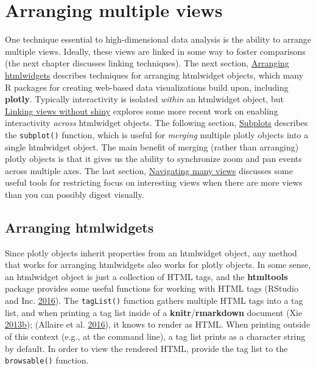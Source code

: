 \documentclass[12pt,]{isuthesis}
\begin{document}
\hypertarget{arranging-multiple-views}{\section{Arranging multiple
views}\label{arranging-multiple-views}}

One technique essential to high-dimensional data analysis is the ability
to arrange multiple views. Ideally, these views are linked in some way
to foster comparisons (the next chapter discusses linking techniques).
The next section, \protect\hyperlink{arranging-htmlwidgets}{Arranging
htmlwidgets} describes techniques for arranging htmlwidget objects,
which many R packages for creating web-based data visualizations build
upon, including \textbf{plotly}. Typically interactivity is isolated
\emph{within} an htmlwidget object, but
\protect\hyperlink{linking-views-without-shiny}{Linking views without
shiny} explores some more recent work on enabling interactivity
\emph{across} htmlwidget objects. The following section,
\protect\hyperlink{subplots}{Subplots} describes the \texttt{subplot()}
function, which is useful for \emph{merging} multiple plotly objects
into a single htmlwidget object. The main benefit of merging (rather
than arranging) plotly objects is that it gives us the ability to
synchronize zoom and pan events across multiple axes. The last section,
\protect\hyperlink{navigating-many-views}{Navigating many views}
discusses some useful tools for restricting focus on interesting views
when there are more views than you can possibly digest visually.

\hypertarget{arranging-htmlwidgets}{\subsection{Arranging
htmlwidgets}\label{arranging-htmlwidgets}}

Since plotly objects inherit properties from an htmlwidget object, any
method that works for arranging htmlwidgets also works for plotly
objects. In some sense, an htmlwidget object is just a collection of
HTML tags, and the \textbf{htmltools} package provides some useful
functions for working with HTML tags (RStudio and Inc.
\protect\hyperlink{ref-htmltools}{2016}). The \texttt{tagList()}
function gathers multiple HTML tags into a tag list, and when printing a
tag list inside of a \textbf{knitr}/\textbf{rmarkdown} document (Xie
\protect\hyperlink{ref-knitr}{2013}\protect\hyperlink{ref-knitr}{b});
(Allaire et al. \protect\hyperlink{ref-rmarkdown}{2016}), it knows to
render as HTML. When printing outside of this context (e.g., at the
command line), a tag list prints as a character string by default. In
order to view the rendered HTML, provide the tag list to the
\texttt{browsable()} function.
\end{document}
